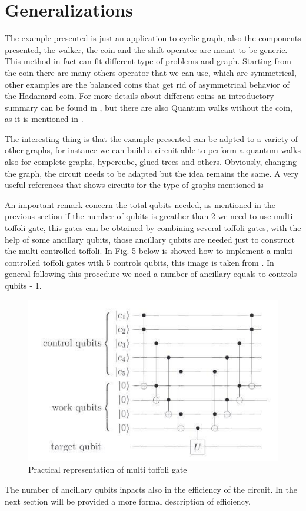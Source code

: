 \section{Generalizations}

The example presented is just an application to cyclic graph, also the components presented, the walker, 
the coin and the shift operator are meant to be generic. This method in fact can fit different type of problems and graph.
Starting from the coin there are many others operator that we can use, which are symmetrical, other examples are the 
balanced coins that get rid of asymmetrical behavior of the Hadamard coin. For more details
about different coins an introductory summary can be found in \cite{Kempe_2003}, but there are also Quantum walks without
the coin, as it is mentioned in \cite{6812670}.


The interesting thing is that the example presented can be adpted to a variety of other graphs, for instance we can
build a circuit able to perform a quantum walks also for complete graphs, hypercube, glued trees and others. 
Obviously, changing the graph, the circuit needs to be adapted but the idea remains the same. A very useful
references that shows circuits for the type of graphs mentioned is \cite{douglas2007efficient}


An important remark concern the total qubits needed, as mentioned in the previous section if
the number of qubits is greather than 2 we need to use multi toffoli gate, this gates can be 
obtained by combining several toffoli gates, with the help of some ancillary qubits, those 
ancillary qubits are needed just to construct the multi controlled toffoli. In Fig. 5 below
is showed how to implement a multi controlled toffoli gates with 5 controls qubits, 
this image is taken from \cite{nielsen_chuang_2010}. In general following this procedure
we need a number of ancillary equals to controls qubits - 1.

\begin{figure}[h!]
    \includegraphics[scale=0.5]{img/ancillary.jpg}
    \caption{Practical representation of multi toffoli gate}
    \centering
\end{figure}

The number of ancillary qubits inpacts also in the efficiency of the circuit. In the next
section will be provided a more formal description of efficiency.
